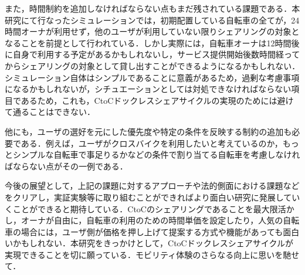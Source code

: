     \par また，時間制約を追加しなければならない点もまだ残されている課題である．本研究にて行なったシミュレーションでは，初期配置している自転車の全てが，24時間オーナが利用せず，他のユーザが利用していない限りシェアリングの対象となることを前提として行われている．しかし実際には，自転車オーナは12時間後に自身で利用する予定があるかもしれないし，サービス提供開始後数時間経ってからシェアリングの対象として貸し出すことができるようになるかもしれない．シミュレーション自体はシンプルであることに意義があるため，過剰な考慮事項になるかもしれないが，シチュエーションとしては対処できなければならない項目であるため，これも，CtoCドックレスシェアサイクルの実現のためには避けて通ることはできない．
    \par 他にも，ユーザの選好を元にした優先度や特定の条件を反映する制約の追加も必要である．例えば，ユーザがクロスバイクを利用したいと考えているのか，もっとシンプルな自転車で事足りるかなどの条件で割り当てる自転車を考慮しなければならない点がその一例である．
    \par 今後の展望として，上記の課題に対するアプローチや法的側面における課題などをクリアし，実証実験等に取り組むことができればより面白い研究に発展していくことができると期待している．CtoCのシェアリングであることを最大限活かし，オーナが自由に，自転車の利用のための時間単価を設定したり，人気の自転車の場合には，ユーザ側が価格を押し上げて提案する方式や機能があっても面白いかもしれない．本研究をきっかけとして，CtoCドックレスシェアサイクルが実現できることを切に願っている．モビリティ体験のさらなる向上に思いを馳せて．
